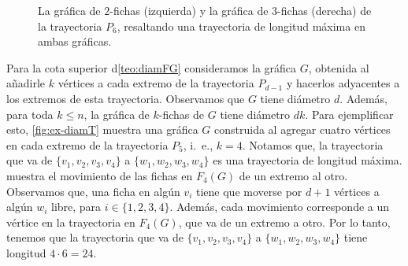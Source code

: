 \begin{figure}[ht!]

\caption{La gr\'afica de $2$-fichas (izquierda) y la gr\'afica de $3$-fichas
(derecha) de la trayectoria $P_6$, resaltando una trayectoria de longitud
m\'axima en ambas gr\'aficas.}
\label{fig:ex-diamP}       
\end{figure}

Para la cota superior d\cref{teo:diamFG} consideramos la gr\'afica $G$, obtenida
al a\~{n}adirle $k$ v\'ertices a cada extremo de la trayectoria $P_{d -1}$ y
hacerlos adyacentes a los extremos de esta trayectoria. Observamos que $G$ tiene
di\'ametro $d$. Adem\'as, para toda $k \leq n$, la gr\'afica de $k$-fichas de
$G$ tiene di\'ametro $dk$. Para ejemplificar esto, \cref{fig:ex-diamT} muestra
una gr\'afica $G$ construida al agregar cuatro v\'ertices en cada extremo de la
trayectoria $P_5$, i.~e., $k=4$. Notamos que, la trayectoria que va de
$\{v_1,v_2,v_3,v_4\}$ a $\{w_1,w_2,w_3,w_4\}$ es una trayectoria de longitud
m\'axima.  muestra el movimiento de las fichas en $F_4(G)$ de
un extremo al otro. Observamos que, una ficha en alg\'un $v_i$ tiene que moverse
por $d +1$ v\'ertices a alg\'un $w_i$ libre, para $i \in \{1,2,3,4\}$. Adem\'as,
cada movimiento corresponde a un v\'ertice en la trayectoria en $F_4(G)$, que va
de un extremo a otro. Por lo tanto, tenemos que la trayectoria que va de
$\{v_1,v_2,v_3,v_4\}$ a $\{w_1,w_2,w_3,w_4\}$ tiene longitud $4 \cdot 6 = 24$.

